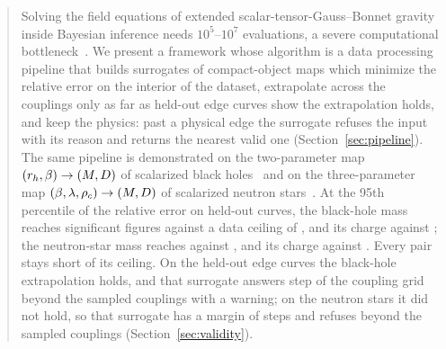 \begin{abstract}
Solving the field equations of extended scalar-tensor-Gauss--Bonnet gravity inside Bayesian inference needs $10^5$--$10^7$ evaluations, a severe computational bottleneck~\citep{Reed2024}. We present a framework whose algorithm is a data processing pipeline that builds surrogates of compact-object maps which minimize the relative error on the interior of the dataset, extrapolate across the couplings only as far as held-out edge curves show the extrapolation holds, and keep the physics: past a physical edge the surrogate refuses the input with its reason and returns the nearest valid one (Section~\ref{sec:pipeline}). The same pipeline is demonstrated on the two-parameter map $(\rh, \beta) \to (M, \Dch)$ of scalarized black holes~\citep{Doneva2017_BH} and on the three-parameter map $(\beta, \lambda, \rhoc) \to (M, \Dch)$ of scalarized neutron stars~\citep{Doneva2017_NS}. At the 95th percentile of the relative error on held-out curves, the black-hole mass reaches \resultsBhMassTest{} significant figures against a data ceiling of \resultsBhMassCeiling{}, and its charge \resultsBhChargeTest{} against \resultsBhChargeCeiling{}; the neutron-star mass reaches \resultsNsMassTest{} against \resultsNsMassCeiling{}, and its charge \resultsNsChargeTest{} against \resultsNsChargeCeiling{}. Every pair stays short of its ceiling. On the held-out edge curves the black-hole extrapolation holds, and that surrogate answers \validityBhMarginSteps{} step of the coupling grid beyond the sampled couplings with a warning; on the neutron stars it did not hold, so that surrogate has a margin of \validityNsMarginSteps{} steps and refuses beyond the sampled couplings (Section~\ref{sec:validity}).
\end{abstract}
